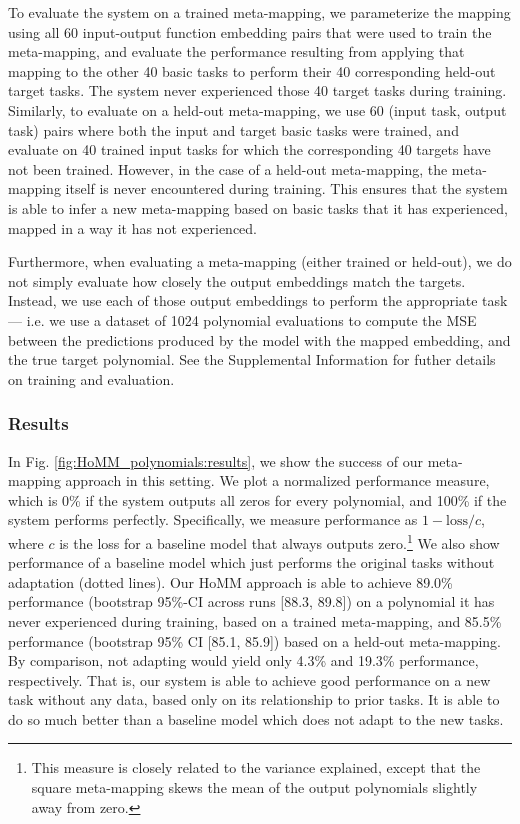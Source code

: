 To evaluate the system on a trained meta-mapping, we parameterize the mapping using all 60 input-output function embedding pairs that were used to train the meta-mapping, and evaluate the performance resulting from applying that mapping to the other 40 basic tasks to perform their 40 corresponding held-out target tasks. The system never experienced those 40 target tasks during training. Similarly, to evaluate on a held-out meta-mapping, we use 60 (input task, output task) pairs where both the input and target basic tasks were trained, and evaluate on 40 trained input tasks for which the corresponding 40 targets have not been trained. However, in the case of a held-out meta-mapping, the meta-mapping itself is never encountered during training. This ensures that the system is able to infer a new meta-mapping based on basic tasks that it has experienced, mapped in a way it has not experienced. 

Furthermore, when evaluating a meta-mapping (either trained or held-out), we do not simply evaluate how closely the output embeddings match the targets. Instead, we use each of those output embeddings to perform the appropriate task --- i.e. we use a dataset of 1024 polynomial evaluations to compute the MSE between the predictions produced by the model with the mapped embedding, and the true target polynomial. See the Supplemental Information for futher details on training and evaluation.

\subsubsection{Results}
In Fig. \ref{fig:HoMM_polynomials:results}, we show the success of our meta-mapping approach in this setting. We plot a normalized performance measure, which is 0\% if the system outputs all zeros for every polynomial, and 100\% if the system performs perfectly. Specifically, we measure performance as \(1 - \text{loss}/c\), where \(c\) is the loss for a baseline model that always outputs zero.\footnote{This measure is closely related to the variance explained, except that the square meta-mapping skews the mean of the output polynomials slightly away from zero.} We also show performance of a baseline model which just performs the original tasks without adaptation (dotted lines). Our HoMM approach is able to achieve 89.0\% performance (bootstrap 95\%-CI across runs [88.3, 89.8]) on a polynomial it has never experienced during training, based on a trained meta-mapping, and 85.5\% performance (bootstrap 95\% CI [85.1, 85.9]) based on a held-out meta-mapping. By comparison, not adapting would yield only 4.3\% and 19.3\% performance, respectively. That is, our system is able to achieve good performance on a new task without any data, based only on its relationship to prior tasks. It is able to do so much better than a baseline model which does not adapt to the new tasks. 

